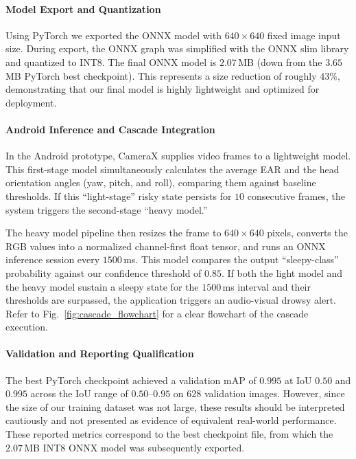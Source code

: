 \documentclass[pdflatex,sn-mathphys-num]{sn-jnl}
\theoremstyle{thmstyleone}%
\theoremstyle{thmstyletwo}%
\theoremstyle{thmstylethree}%
\begin{document}
	\paragraph{Model Export and Quantization}
	Using PyTorch we exported the ONNX model with $640 \times 640$ fixed image input size. During export, the ONNX graph was simplified with the ONNX slim library and quantized to INT8. The final ONNX model is $2.07$\,MB (down from the $3.65$\,MB PyTorch best checkpoint). This represents a size reduction of roughly $43\%$, demonstrating that our final model is highly lightweight and optimized for deployment.
	
	\paragraph{Android Inference and Cascade Integration}
	In the Android prototype, CameraX supplies video frames to a lightweight model. This first-stage model simultaneously calculates the average EAR and the head orientation angles (yaw, pitch, and roll), comparing them against baseline thresholds. If this ``light-stage'' risky state persists for $10$ consecutive frames, the system triggers the second-stage ``heavy model.''
	
	The heavy model pipeline then resizes the frame to $640 \times 640$ pixels, converts the RGB values into a normalized channel-first float tensor, and runs an ONNX inference session every $1500$\,ms. This model compares the output ``sleepy-class'' probability against our confidence threshold of $0.85$. If both the light model and the heavy model sustain a sleepy state for the $1500$\,ms interval and their thresholds are surpassed, the application triggers an audio-visual drowsy alert. Refer to Fig.~\ref{fig:cascade_flowchart} for a clear flowchart of the cascade execution.
	
	\paragraph{Validation and Reporting Qualification}
	The best PyTorch checkpoint achieved a validation mAP of $0.995$ at IoU $0.50$ and $0.995$ across the IoU range of $0.50$--$0.95$ on $628$ validation images. However, since the size of our training dataset was not large, these results should be interpreted cautiously and not presented as evidence of equivalent real-world performance. These reported metrics correspond to the best checkpoint file, from which the $2.07$\,MB INT8 ONNX model was subsequently exported.
	
\end{document}
